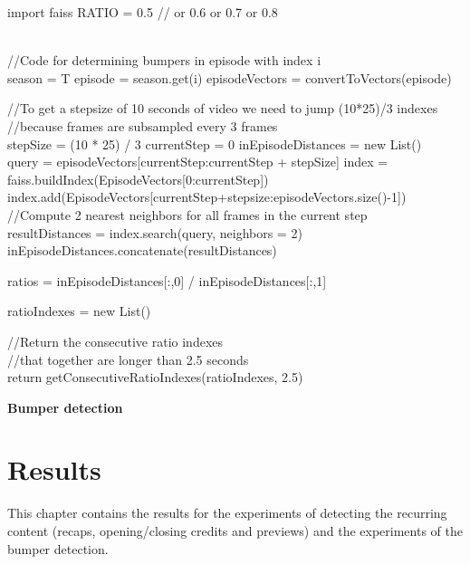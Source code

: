 \documentclass{report}
\begin{document}
\begin{algorithm}[H] 
	\SetAlgoLined
	
	import faiss\;
	RATIO = 0.5 // or 0.6 or 0.7 or 0.8 \\
	\texttt{\\}
	
	//Code for determining bumpers in episode with index i \\
	season = T\;
	episode = season.get(i)\;
	episodeVectors = convertToVectors(episode)\;
	\texttt{\\}
		
	//To get a stepsize of 10 seconds of video we need to jump (10*25)/3 indexes \\
	//because frames are subsampled every 3 frames \\
	stepSize = (10 * 25) / 3 \;
	currentStep = 0\;
	inEpisodeDistances = new List()\;
	{
	\texttt{\\}
	 query = episodeVectors[currentStep:currentStep + stepSize] \;
	 index = faiss.buildIndex(EpisodeVectors[0:currentStep])\;
	 index.add(EpisodeVectors[currentStep+stepsize:episodeVectors.size()-1])\;
	 \texttt{\\}
	 //Compute 2 nearest neighbors for all frames in the current step \\
	 resultDistances = index.search(query, neighbors = 2)\;
	 inEpisodeDistances.concatenate(resultDistances)\;
	}

	ratios = inEpisodeDistances[:,0] / inEpisodeDistances[:,1]\;
	
	ratioIndexes = new List()\;
	
	//Return the consecutive ratio indexes  \\
	//that together are longer than 2.5 seconds \\
	return getConsecutiveRatioIndexes(ratioIndexes, 2.5)\;
	
	\caption{\textbf{Bumper detection}}
	\label{algorithm:shotboundary}
\end{algorithm}

\chapter{Results} \label{results}
This chapter contains the results for the experiments of detecting the recurring content (recaps, opening/closing credits and previews) and the experiments of the bumper detection.
\end{document}
